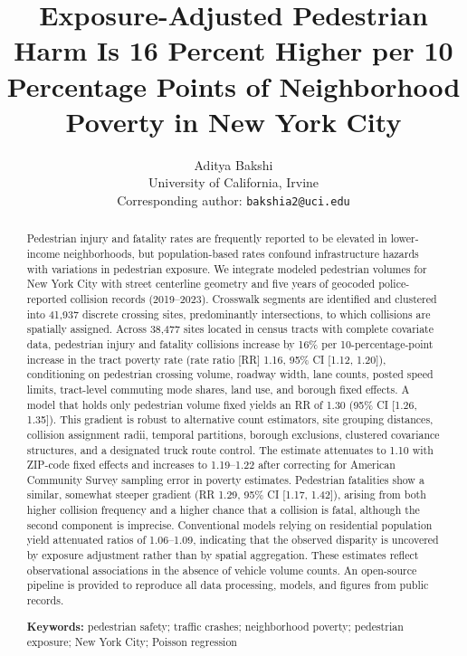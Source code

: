 \documentclass[10pt,twocolumn]{article}
\title{Exposure-Adjusted Pedestrian Harm Is 16 Percent Higher per 10 Percentage Points of Neighborhood Poverty in New York City}
\author{Aditya Bakshi\\\small University of California, Irvine\\\small Corresponding author: \texttt{bakshia2@uci.edu}}
\begin{document}
\date{}
\maketitle

\begin{abstract}
Pedestrian injury and fatality rates are frequently reported to be elevated in lower-income neighborhoods, but population-based rates confound infrastructure hazards with variations in pedestrian exposure. We integrate modeled pedestrian volumes for New York City with street centerline geometry and five years of geocoded police-reported collision records (2019--2023). Crosswalk segments are identified and clustered into 41,937 discrete crossing sites, predominantly intersections, to which collisions are spatially assigned. Across 38,477 sites located in census tracts with complete covariate data, pedestrian injury and fatality collisions increase by 16\% per 10-percentage-point increase in the tract poverty rate (rate ratio [RR] 1.16, 95\% CI [1.12, 1.20]), conditioning on pedestrian crossing volume, roadway width, lane counts, posted speed limits, tract-level commuting mode shares, land use, and borough fixed effects. A model that holds only pedestrian volume fixed yields an RR of 1.30 (95\% CI [1.26, 1.35]). This gradient is robust to alternative count estimators, site grouping distances, collision assignment radii, temporal partitions, borough exclusions, clustered covariance structures, and a designated truck route control. The estimate attenuates to 1.10 with ZIP-code fixed effects and increases to 1.19--1.22 after correcting for American Community Survey sampling error in poverty estimates. Pedestrian fatalities show a similar, somewhat steeper gradient (RR 1.29, 95\% CI [1.17, 1.42]), arising from both higher collision frequency and a higher chance that a collision is fatal, although the second component is imprecise. Conventional models relying on residential population yield attenuated ratios of 1.06--1.09, indicating that the observed disparity is uncovered by exposure adjustment rather than by spatial aggregation. These estimates reflect observational associations in the absence of vehicle volume counts. An open-source pipeline is provided to reproduce all data processing, models, and figures from public records.

\medskip
\noindent\textbf{Keywords:} pedestrian safety; traffic crashes; neighborhood poverty; pedestrian exposure; New York City; Poisson regression
\end{abstract}
\end{document}
